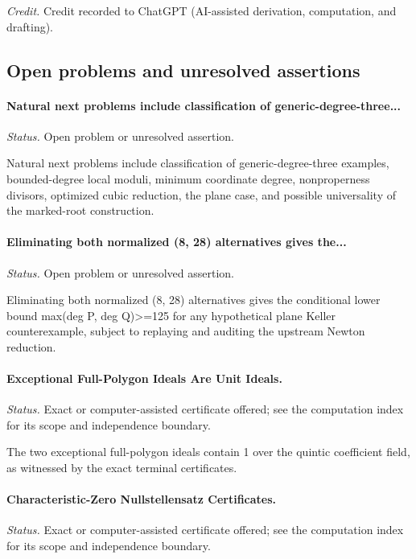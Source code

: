 \emph{Credit.} Credit recorded to ChatGPT (AI-assisted derivation, computation, and drafting).

\subsection{Open problems and unresolved assertions}

\label{supp-note-06-038}
\paragraph{Natural next problems include classification of generic-degree-three...}
\emph{Status.} Open problem or unresolved assertion.

Natural next problems include classification of generic-degree-three examples, bounded-degree local moduli, minimum coordinate degree, nonproperness divisors, optimized cubic reduction, the plane case, and possible universality of the marked-root construction.

\label{supp-note-06-039}
\paragraph{Eliminating both normalized (8, 28) alternatives gives the...}
\emph{Status.} Open problem or unresolved assertion.

Eliminating both normalized (8, 28) alternatives gives the conditional lower bound max(deg P, deg Q)>=125 for any hypothetical plane Keller counterexample, subject to replaying and auditing the upstream Newton reduction.

\label{supp-note-06-040}
\paragraph{Exceptional Full-Polygon Ideals Are Unit Ideals.}
\emph{Status.} Exact or computer-assisted certificate offered; see the computation index for its scope and independence boundary.

The two exceptional full-polygon ideals contain 1 over the quintic coefficient field, as witnessed by the exact terminal certificates.

\label{supp-note-06-041}
\paragraph{Characteristic-Zero Nullstellensatz Certificates.}
\emph{Status.} Exact or computer-assisted certificate offered; see the computation index for its scope and independence boundary.


